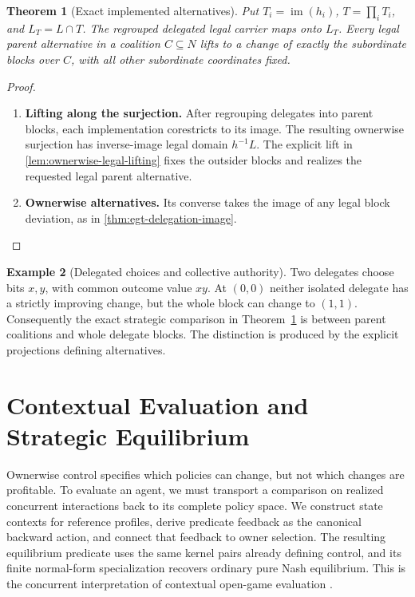 \documentclass[11pt,a4paper]{article}
\numberwithin{equation}{section}
\newtheorem{theorem}{Theorem}[section]
\theoremstyle{definition}
\newtheorem{example}[theorem]{Example}
\theoremstyle{remark}
\theoremstyle{plain}
\providecommand{\im}{\mathop{\mathrm{im}}}
\begin{document}
\begin{theorem}[Exact implemented alternatives]
\label{agt-thm-delegation-image}
Put $T_i=\im(h_i)$, $T=\prod_iT_i$, and $L_T=L\cap T$. The regrouped
delegated legal carrier maps onto $L_T$. Every legal parent alternative in
a coalition $C\subseteq N$ lifts to a change of exactly the subordinate
blocks over $C$, with all other subordinate coordinates fixed.
\end{theorem}
\begin{proof}
\leavevmode
\begin{enumerate}[label=\textup{(\arabic*)},leftmargin=*,itemsep=4pt,topsep=3pt]
  \item \textbf{Lifting along the surjection.} After regrouping delegates into parent blocks, each implementation
corestricts to its image. The resulting ownerwise surjection has
inverse-image legal domain $h^{-1}L$. The explicit lift in
\cref{lem:ownerwise-legal-lifting} fixes the outsider blocks and realizes
the requested legal parent alternative.
  \item \textbf{Ownerwise alternatives.} Its converse takes the image
of any legal block deviation, as in \cref{thm:egt-delegation-image}.
\end{enumerate}
\end{proof}

\begin{example}[Delegated choices and collective authority]
Two delegates choose bits $x,y$, with common outcome value $xy$. At $(0,0)$
neither isolated delegate has a strictly improving change, but the whole
block can change to $(1,1)$. Consequently the exact strategic comparison in
Theorem~\ref{agt-thm-delegation-image} is between parent coalitions and whole
delegate blocks. The distinction is produced by the explicit projections
defining alternatives.
\end{example}

\section{Contextual Evaluation and Strategic Equilibrium}\label{sec:paper-5}

Ownerwise control specifies which policies can change, but not which
changes are profitable. To evaluate an agent, we must transport a
comparison on realized concurrent interactions back to its complete
policy space. We construct state contexts for reference profiles, derive
predicate feedback as the canonical backward action, and connect that
feedback to owner selection. The resulting equilibrium predicate uses
the same kernel pairs already defining control, and its finite
normal-form specialization recovers ordinary pure Nash equilibrium.
This is the concurrent interpretation of contextual open-game evaluation
\citep{CapucciEtAl2022Cybernetics}.
\end{document}
